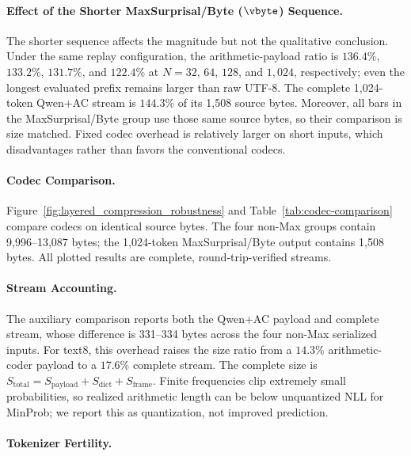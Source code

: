 \paragraph{Effect of the Shorter MaxSurprisal/Byte ($\vbyte$) Sequence.}
\label{app:maxsurprisal-length}
The shorter sequence affects the magnitude but not the qualitative conclusion.
Under the same replay configuration, the arithmetic-payload ratio is $136.4\%$,
$133.2\%$, $131.7\%$, and $122.4\%$ at $N=32$, $64$, $128$, and $1{,}024$,
respectively; even the longest evaluated prefix remains larger than raw UTF-8.
The complete 1,024-token Qwen+AC stream is $144.3\%$ of its 1,508 source bytes.
Moreover, all bars in the MaxSurprisal/Byte group use those same source bytes,
so their comparison is size matched. Fixed codec overhead is relatively larger
on short inputs, which disadvantages rather than favors the conventional codecs.

\paragraph{Codec Comparison.}
Figure~\ref{fig:layered_compression_robustness} and
Table~\ref{tab:codec-comparison} compare codecs on identical source bytes. The
four non-Max groups contain 9,996--13,087 bytes; the 1,024-token
MaxSurprisal/Byte output contains 1,508 bytes. All plotted results are complete, round-trip-verified streams.

\paragraph{Stream Accounting.}
\label{app:stream-accounting}
The auxiliary comparison reports both the Qwen+AC payload and complete stream,
whose difference is 331--334 bytes across the four non-Max serialized inputs.
For text8, this overhead raises the size ratio from a $14.3\%$ arithmetic-coder
payload to a $17.6\%$ complete stream. The
complete size is $S_{\mathrm{total}}=S_{\mathrm{payload}}+S_{\mathrm{dict}}+
S_{\mathrm{frame}}$. Finite frequencies clip extremely small probabilities, so
realized arithmetic length can be below unquantized NLL for MinProb; we report
this as quantization, not improved prediction.



\paragraph{Tokenizer Fertility.}

